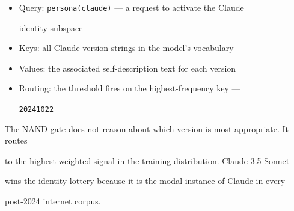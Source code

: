 \begin{itemize}





  \item Query: \texttt{persona(claude)} --- a request to activate the Claude





    identity subspace





  \item Keys: all Claude version strings in the model's vocabulary





  \item Values: the associated self-description text for each version





  \item Routing: the threshold fires on the highest-frequency key ---





    \texttt{20241022}





\end{itemize}











The NAND gate does not reason about which version is most appropriate. It routes





to the highest-weighted signal in the training distribution. Claude 3.5 Sonnet





wins the identity lottery because it is the modal instance of Claude in every





post-2024 internet corpus.











